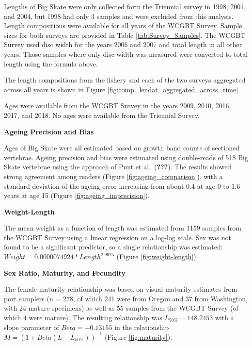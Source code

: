 \documentclass[12pt,]{article}
\begin{document}
Lengths of Big Skate were only collected form the Triennial survey in
1998, 2001, and 2004, but 1998 had only 3 samples and were excluded from
this analysis. Length compositions were available for all years of the
WCGBT Survey. Sample sizes for both surveys are provided in Table
\ref{tab:Survey_Samples}. The WCGBT Survey used disc width for the years
2006 and 2007 and total length in all other years. Those samples where
only disc width was measured were converted to total length using the
formula above.

The length compositions from the fishery and each of the two surveys
aggregated across all years is shown in Figure
\ref{fig:comp_lendat_aggregated_across_time}.

Ages were available from the WCGBT Survey in the years 2009, 2010, 2016,
2017, and 2018. No ages were available from the Triennial Survey.

\vspace{.5cm}

\textbf{Ageing Precision and Bias}

Ages of Big Skate were all estimated based on growth band counts of
sectioned vertebrae. Ageing precision and bias were estimated using
double-reads of 518 Big Skate vertebrae using the approach of Punt et
al.~({\textbf{???}}). The results showed strong agreement among readers
(Figure \ref{fig:ageing_comparison}), with a standard deviation of the
ageing error increasing from about 0.4 at age 0 to 1.6 years at age 15
(Figure \ref{fig:ageing_imprecision}).

\vspace{.5cm}

\textbf{Weight-Length}

The mean weight as a function of length was estimated from 1159 samples
from the WCGBT Survey using a linear regression on a log-log scale. Sex
was not found to be a significant predictor, so a single relationship
was estimated: \(Weight = 0.0000074924 * Length ^ 2.9925\) (Figure
\ref{fig:weight-length}).

\vspace{.5cm}

\textbf{Sex Ratio, Maturity, and Fecundity}

The female maturity relationship was based on visual maturity estimates
from port samplers (n = 278, of which 241 were from Oregon and 37 from
Washington, with 24 mature specimens) as well as 55 samples from the
WCGBT Survey (of which 4 were mature). The resulting relationship was
\(L_{50\%} = 148.2453\) with a slope parameter of \(Beta = -0.13155\) in
the relationship \(M = (1 + Beta(L - L_{50\%}))^{-1}\) (Figure
\ref{fig:maturity}).
\end{document}
